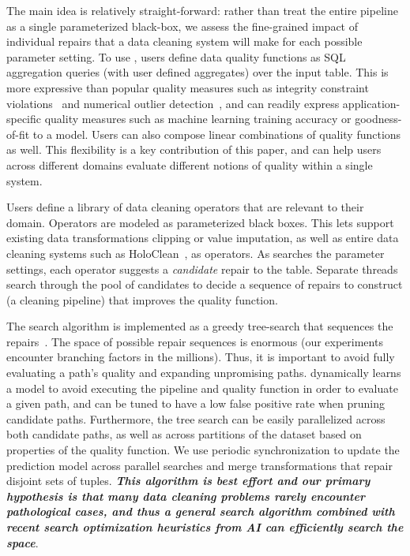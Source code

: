 The main idea is relatively straight-forward: rather than treat the entire pipeline as a single parameterized black-box, we assess the fine-grained impact of individual repairs that a data cleaning system will make for each possible parameter setting.
To use \sys, users define data quality functions as SQL aggregation queries (with user defined aggregates) over the input table.  This is more expressive than popular quality measures such as integrity constraint violations~\cite{ilyas2015trends} and numerical outlier detection~\cite{bailis2017macrobase}, and can readily express application-specific quality measures such as machine learning training accuracy or goodness-of-fit to a model.  Users can also compose linear combinations of quality functions as well.  This flexibility is a key contribution of this paper, and can help users across different domains evaluate different notions of quality within a single system. 

Users define a library of data cleaning operators that are relevant to their domain.  Operators are modeled as parameterized black boxes.  This lets \sys support existing data transformations clipping or value imputation, as well as entire data cleaning systems such as HoloClean~\cite{rekatsinas2017holoclean}, as operators.
As \sys searches the parameter settings, each operator suggests a \emph{candidate} repair to the table.
Separate threads search through the pool of candidates to decide a sequence of repairs to construct (a cleaning pipeline) that improves the quality function.

The search algorithm is implemented as a greedy tree-search that sequences the repairs~\cite{russell2016artificial}.
The space of possible repair sequences is enormous (our experiments encounter branching factors in the millions).
Thus, it is important to avoid fully evaluating a path's quality and expanding unpromising paths.    
\sys dynamically learns a model to avoid executing the pipeline and quality function in order to evaluate a given path, and can be tuned to have a low false positive rate when pruning candidate paths.  
Furthermore, the tree search can be easily parallelized across both candidate paths, as well as across partitions of the dataset based on properties of the quality function.
We use periodic synchronization to update the prediction model across parallel searches and merge transformations that repair disjoint sets of tuples. 
\textbf{\emph{This algorithm is best effort and our primary hypothesis is that many data cleaning problems rarely encounter pathological cases, and thus a general search algorithm combined with recent search optimization heuristics from AI can efficiently search the space}}.

